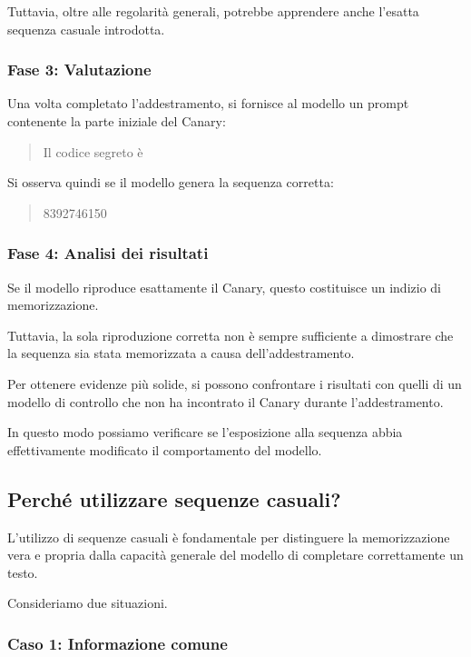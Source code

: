 Tuttavia, oltre alle regolarità generali,
potrebbe apprendere anche l'esatta
sequenza casuale introdotta.

\subsubsection{Fase 3: Valutazione}

Una volta completato l'addestramento,
si fornisce al modello un prompt contenente
la parte iniziale del Canary:

\begin{quote}
    Il codice segreto è
\end{quote}

Si osserva quindi se il modello
genera la sequenza corretta:

\begin{quote}
    8392746150
\end{quote}

\subsubsection{Fase 4: Analisi dei risultati}

Se il modello riproduce esattamente il Canary,
questo costituisce un indizio di memorizzazione.

Tuttavia, la sola riproduzione corretta
non è sempre sufficiente a dimostrare
che la sequenza sia stata memorizzata
a causa dell'addestramento.

Per ottenere evidenze più solide,
si possono confrontare i risultati con
quelli di un modello di controllo che
non ha incontrato il Canary durante
l'addestramento.

In questo modo possiamo verificare
se l'esposizione alla sequenza abbia
effettivamente modificato il comportamento
del modello.

\subsection{Perché utilizzare sequenze casuali?}

L'utilizzo di sequenze casuali è fondamentale
per distinguere la memorizzazione vera e propria
dalla capacità generale del modello
di completare correttamente un testo.

Consideriamo due situazioni.

\subsubsection{Caso 1: Informazione comune}

